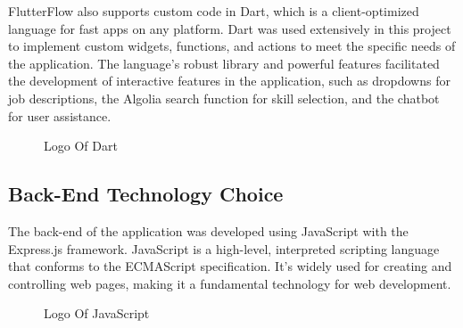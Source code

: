 FlutterFlow also supports custom code in {\color{purple} Dart}, which is a client-optimized language for fast apps on any platform. Dart was used extensively in this project to implement custom widgets, functions, and actions to meet the specific needs of the application. The language's robust library and powerful features facilitated the development of interactive features in the application, such as dropdowns for job descriptions, the Algolia search function for skill selection, and the chatbot for user assistance.

\begin{figure}[H]
    \centering
    \caption{  Logo Of Dart }
    \label{fig: Dart_Logo}
\end{figure}

\subsection{Back-End Technology Choice}
The back-end of the application was developed using {\color{purple}JavaScript} with the {\color{purple}Express.js} framework. JavaScript is a high-level, interpreted scripting language that conforms to the ECMAScript specification. It's widely used for creating and controlling web pages, making it a fundamental technology for web development.

\begin{figure}[H]
    \centering
    \caption{  Logo Of JavaScript }
    \label{fig: JS_Logo}
\end{figure}

